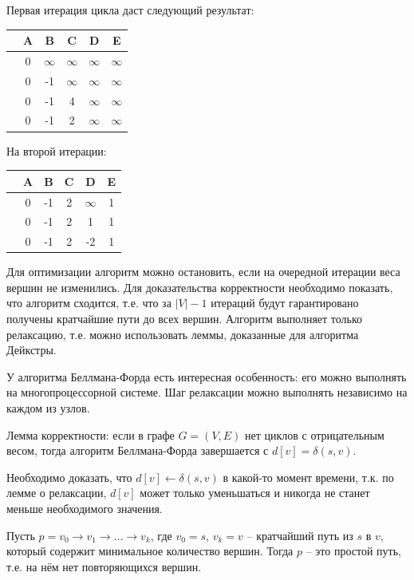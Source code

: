 \documentclass[11pt]{article}
\begin{document}
Первая итерация цикла даст следующий результат:
\begin{center}
\begin{tabular}{|r|c|c|c|c|c|}
  \hline
      & \textbf{A} & \textbf{B} & \textbf{C} & \textbf{D} & \textbf{E} \\
  \hline
         & 0 & $\infty$ & $\infty$ & $\infty$ & $\infty$ \\
  \hline
         & 0 & -1 & $\infty$ & $\infty$ & $\infty$ \\
  \hline
         & 0 & -1 & 4 & $\infty$ & $\infty$ \\
  \hline
         & 0 & -1 & 2 & $\infty$ & $\infty$ \\
  \hline
\end{tabular}
\end{center}

На второй итерации:
\begin{center}
\begin{tabular}{|r|c|c|c|c|c|}
  \hline
      & \textbf{A} & \textbf{B} & \textbf{C} & \textbf{D} & \textbf{E} \\
  \hline
         & 0 & -1 & 2 & $\infty$ & 1 \\
  \hline
         & 0 & -1 & 2 & 1 & 1 \\
  \hline
         & 0 & -1 & 2 & -2 & 1 \\
  \hline
\end{tabular}
\end{center}

Для оптимизации алгоритм можно остановить, если на очередной итерации веса вершин не изменились. Для доказательства корректности необходимо показать, что алгоритм сходится, т.е. что за $|V|-1$ итераций будут гарантировано получены кратчайшие пути до всех вершин. Алгоритм выполняет только релаксацию, т.е. можно использовать леммы, доказанные для алгоритма Дейкстры. 

У алгоритма Беллмана-Форда есть интересная особенность: его можно выполнять на многопроцессорной системе. Шаг релаксации можно выполнять независимо на каждом из узлов.

Лемма корректности: если в графе $G=(V, E)$ нет циклов с отрицательным весом, тогда алгоритм Беллмана-Форда завершается с $d[v] = \delta(s, v)$.

Необходимо доказать, что $d[v] \gets \delta(s, v)$ в какой-то момент времени, т.к. по лемме о релаксации, $d[v]$ может только уменьшаться и никогда не станет меньше необходимого значения.

Пусть $p = v_0 \rightarrow v_1 \rightarrow \ldots \rightarrow v_k$, где $v_0 = s$, $v_k = v$ -- кратчайший путь из $s$ в $v$, который содержит минимальное количество вершин. Тогда $p$ -- это простой путь, т.е. на нём нет повторяющихся вершин.
\end{document}
